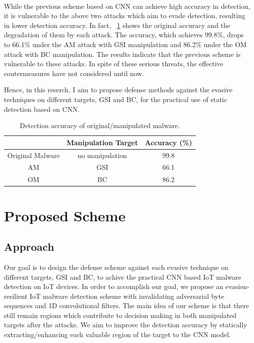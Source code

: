 \documentclass{ieeeaccess}
\begin{document}
\paragraph*{}
While the previous scheme based on CNN can achieve high accuracy in detection, it is vulnerable to the above two attacks which aim to evade detection, resulting in lower detection accuracy.
In fact, \tablename~\ref{tab:prev} shows the original accuracy and the degradation of them by each attack.
The accuracy, which achieves 99.8\%, drops to 66.1\% under the AM attack with GSI manipulation and 86.2\% under the OM attack with BC manipulation.
The results indicate that the previous scheme is vulnerable to these attacks.
In spite of these serious threats, the effective coutermeasures have not considered until now.

Hence, in this reserch, I aim to propose defense methods against the evasive techniques on different targets, GSI and BC, for the practical use of static detection based on CNN.

\begin{table}[h]
  \begin{center}
    \caption{Detection accuracy of original/manipulated malware.}
    \label{tab:prev} 
    \begin{tabular}{|c|c|c|} \hline
       & Manipulation Target & Accuracy (\%) \\ \hline \hline
      Original Malware & no manipulation  & 99.8  \\ \hline
      AM & GSI & 66.1  \\ \hline 
      OM & BC & 86.2 \\ \hline
    \end{tabular}
  \end{center}
\end{table} 

\section{Proposed Scheme} \label{sec:proposed_scheme}
\subsection{Approach}
Our goal is to design the defense scheme against each evasive technique on different targets, GSI and BC, to achive the practical CNN based IoT malware detection on IoT devices.
In order to accomplish our goal, we propose an evasion-resilient IoT malware detection scheme with invalidating adversarial byte sequences and 1D convolutional filters.  
The main idea of our scheme is that there still remain regions which contribute to decision making in both manipulated targets after the attacks.
We aim to improve the detection accuracy by statically extracting/enhancing each valuable region of the target to the CNN model.
\end{document}
